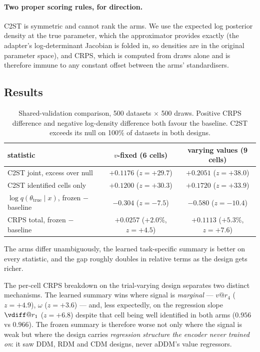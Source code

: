 \documentclass[11pt]{article}
\begin{document}
\paragraph{Two proper scoring rules, for direction.} C2ST is symmetric and cannot rank
the arms. We use the expected log posterior density at the true parameter, which the
approximator provides exactly (the adapter's log-determinant Jacobian is folded in, so
densities are in the original parameter space), and CRPS, which is computed from draws
alone and is therefore immune to any constant offset between the arms' standardisers.

\subsection{Results}

\begin{table}[h]
\centering
\begin{tabular}{l cc}
\toprule
statistic & $v$-fixed (6 cells) & varying values (9 cells) \\
\midrule
C2ST joint, excess over null      & $+0.1176$ ($z{=}{+}29.7$) & $\mathbf{+0.2051}$ ($z{=}{+}38.0$) \\
C2ST identified cells only        & $+0.1200$ ($z{=}{+}30.3$) & $+0.1720$ ($z{=}{+}33.9$) \\
$\log q(\theta_{\text{true}}\mid x)$, frozen $-$ baseline & $-0.304$ ($z{=}{-}7.5$) & $\mathbf{-0.580}$ ($z{=}{-}10.4$) \\
CRPS total, frozen $-$ baseline   & $+0.0257$ ($+2.0\%$, $z{=}{+}4.5$) & $\mathbf{+0.1113}$ ($+5.3\%$, $z{=}{+}7.6$) \\
\bottomrule
\end{tabular}
\caption{Shared-validation comparison, 500 datasets $\times$ 500 draws. Positive CRPS
difference and negative log-density difference both favour the baseline. C2ST exceeds
its null on 100\% of datasets in both designs.}
\label{tab:arms}
\end{table}

The arms differ unambiguously, the learned task-specific summary is better on every
statistic, and the gap roughly doubles in relative terms as the design gets richer.

The per-cell CRPS breakdown on the trial-varying design separates two distinct
mechanisms. The learned summary wins where signal is \emph{marginal} --- $v@r_4$
($z{=}{+}4.9$), $\omega$ ($z{=}{+}3.6$) --- and, less expectedly, on the regression
slope $\vdiff@r_1$ ($z{=}{+}6.8$) despite that cell being well identified in both arms
($0.956$ vs $0.966$). The frozen summary is therefore worse not only where the signal
is weak but where the design carries \emph{regression structure the encoder never
trained on}: it saw DDM, RDM and CDM designs, never aDDM's value regressors.
\end{document}
